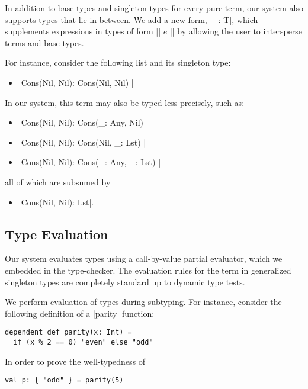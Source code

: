 In addition to base types and singleton types for every pure term, our system also supports types that lie in-between. We add a new form, |_: T|, which supplements expressions in types of form |{| $e$ |}| by allowing the user to intersperse terms and base types.

For instance, consider the following list and its singleton type:

\begin{itemize}
  \item |Cons(Nil, Nil): { Cons(Nil, Nil) }|
\end{itemize}

In our system, this term may also be typed less precisely, such as:

\begin{itemize}
  \item |Cons(Nil, Nil): { Cons(_: Any, Nil) }|
  \item |Cons(Nil, Nil): { Cons(Nil, _: Lst) }|
  \item |Cons(Nil, Nil): { Cons(_: Any, _: Lst) }|
\end{itemize}

\noindent
all of which are subsumed by

\begin{itemize}
  \item |Cons(Nil, Nil): Lst|.
\end{itemize}

\subsection{Type Evaluation}

Our system evaluates types using a call-by-value partial evaluator, which we embedded in the type-checker.
The evaluation rules for the term in generalized singleton types are completely standard up to dynamic type tests.

We perform evaluation of types during subtyping.
For instance, consider the following definition of a |parity| function:

\begin{lstlisting}
dependent def parity(x: Int) =
  if (x % 2 == 0) "even" else "odd"
\end{lstlisting}

\noindent
In order to prove the well-typedness of

\begin{lstlisting}
val p: { "odd" } = parity(5)
\end{lstlisting}

